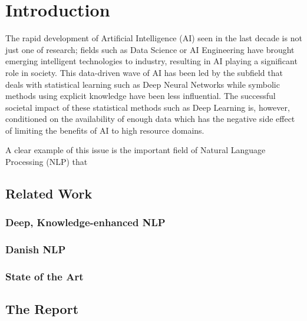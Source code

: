 \documentclass[main.tex]{subfiles}
\begin{document}
\chapter{Introduction}
The rapid development of Artificial Intelligence (AI) seen in the last decade is not just one of research;
fields such as Data Science or AI Engineering have brought emerging intelligent technologies to industry, resulting in AI playing a significant role in society.
This data-driven wave of AI has been led by the subfield that deals with statistical learning such as Deep Neural Networks while symbolic methods using explicit knowledge have been less influential.
The successful societal impact of these statistical methods such as Deep Learning is, however, conditioned on the availability of enough data which has the negative side effect of limiting the benefits of AI to high resource domains.

A clear example of this issue is the important field of Natural Language Processing (NLP) that
\section{Related Work}
\subsection{Deep, Knowledge-enhanced NLP}
\subsection{Danish NLP}
\subsection{State of the Art}

\section{The Report}%
\label{sec:The Report}
\end{document}
